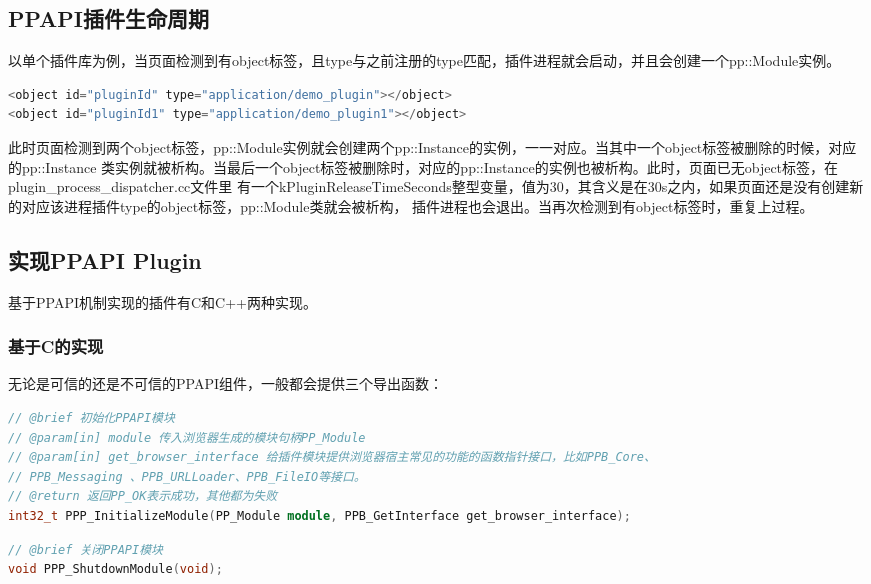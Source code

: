 \subsection{PPAPI插件生命周期}
以单个插件库为例，当页面检测到有object标签，且type与之前注册的type匹配，插件进程就会启动，并且会创建一个pp::Module实例。\\
\begin{spacing}{1.0}
\begin{lstlisting}[language={C++}]
<object id="pluginId" type="application/demo_plugin"></object>
<object id="pluginId1" type="application/demo_plugin1"></object>
\end{lstlisting}
\end{spacing}
此时页面检测到两个object标签，pp::Module实例就会创建两个pp::Instance的实例，一一对应。当其中一个object标签被删除的时候，对应的pp::Instance
类实例就被析构。当最后一个object标签被删除时，对应的pp::Instance的实例也被析构。此时，页面已无object标签，在plugin\_process\_dispatcher.cc文件里
有一个kPluginReleaseTimeSeconds整型变量，值为30，其含义是在30s之内，如果页面还是没有创建新的对应该进程插件type的object标签，pp::Module类就会被析构，
插件进程也会退出。当再次检测到有object标签时，重复上过程。

\subsection{实现PPAPI Plugin}
基于PPAPI机制实现的插件有C和C++两种实现。

\subsubsection{基于C的实现}
无论是可信的还是不可信的PPAPI组件，一般都会提供三个导出函数：
\begin{spacing}{1.0}
\begin{lstlisting}[language={C++}]
// @brief 初始化PPAPI模块
// @param[in] module 传入浏览器生成的模块句柄PP_Module 
// @param[in] get_browser_interface 给插件模块提供浏览器宿主常见的功能的函数指针接口，比如PPB_Core、
// PPB_Messaging 、PPB_URLLoader、PPB_FileIO等接口。
// @return 返回PP_OK表示成功，其他都为失败
int32_t PPP_InitializeModule(PP_Module module, PPB_GetInterface get_browser_interface);
\end{lstlisting}
\end{spacing}

\begin{spacing}{1.0}
\begin{lstlisting}[language={C++}]
// @brief 关闭PPAPI模块
void PPP_ShutdownModule(void);
\end{lstlisting}
\end{spacing}

